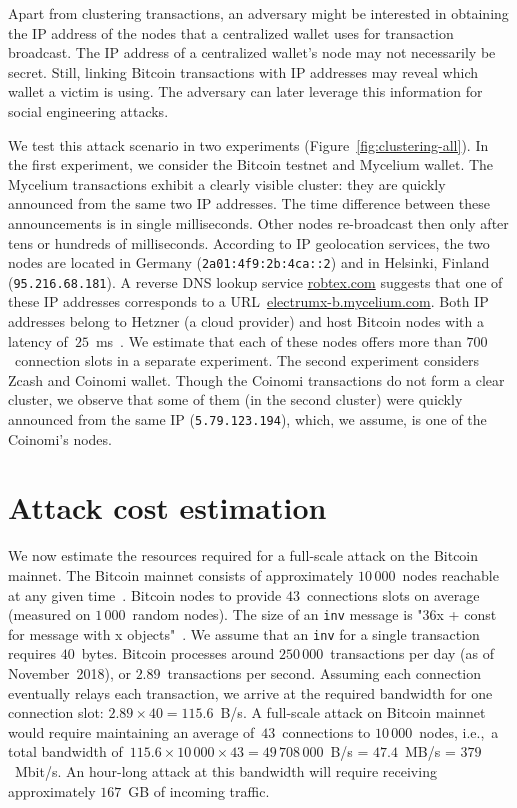 Apart from clustering transactions, an adversary might be interested in obtaining the IP address of the nodes that a centralized wallet uses for transaction broadcast.
The IP address of a centralized wallet's node may not necessarily be secret.
Still, linking Bitcoin transactions with IP addresses may reveal which wallet a victim is using.
The adversary can later leverage this information for social engineering attacks.

We test this attack scenario in two experiments (Figure~\ref{fig:clustering-all}).
In the first experiment, we consider the Bitcoin testnet and Mycelium wallet.
The Mycelium transactions exhibit a clearly visible cluster: they are quickly announced from the same two IP addresses.
The time difference between these announcements is in single milliseconds.
Other nodes re-broadcast then only after tens or hundreds of milliseconds.
According to IP geolocation services, the two nodes are located in Germany (\texttt{2a01:4f9:2b:4ca::2}) and in Helsinki, Finland (\texttt{95.216.68.181}).
A reverse DNS lookup service \url{robtex.com} suggests that one of these IP addresses corresponds to a URL~\url{electrumx-b.mycelium.com}.
Both IP addresses belong to Hetzner (a cloud provider) and host Bitcoin nodes with a latency of~$25$~ms~\cite{Bitnodes}.
We estimate that each of these nodes offers more than $700$~connection slots in a separate experiment.
The second experiment considers Zcash and Coinomi wallet.
Though the Coinomi transactions do not form a clear cluster, we observe that some of them (in the second cluster) were quickly announced from the same IP (\texttt{5.79.123.194}), which, we assume, is one of the Coinomi's nodes.


\section{Attack cost estimation}

We now estimate the resources required for a full-scale attack on the Bitcoin mainnet.
The Bitcoin mainnet consists of approximately $10\,000$~nodes reachable at any given time~\cite{Bitnodes}.
Bitcoin nodes to provide $43$~connections slots on average (measured on $1\,000$~random nodes).
The size of an \texttt{inv} message is "36x + const for message with x objects"~\cite{BitcoinWiki}.
We assume that an \texttt{inv} for a single transaction requires $40$~bytes.
Bitcoin processes around $250\,000$~transactions per day (as of November~2018), or $2.89$~transactions per second.
Assuming each connection eventually relays each transaction, we arrive at the required bandwidth for one connection slot: $2.89 \times 40 = 115.6$~B/s.
A full-scale attack on Bitcoin mainnet would require maintaining an average of~$43$~connections to $10\,000$~nodes, i.e.,~a total bandwidth of~$115.6 \times 10\,000 \times 43 = 49\,708\,000$~B/s = $47.4$~MB/s = $379$~Mbit/s.
An hour-long attack at this bandwidth will require receiving approximately $167$~GB of incoming traffic.

